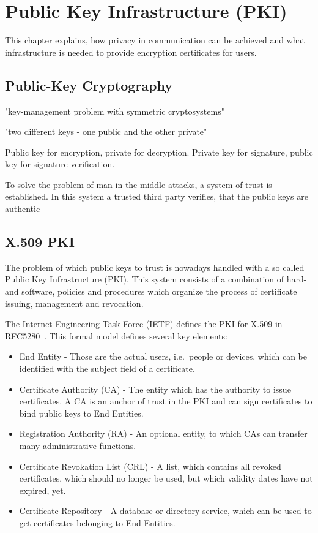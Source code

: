 \chapter{Public Key Infrastructure (PKI)}\label{ch:publicKeyInfrastructure}

This chapter explains, how privacy in communication can be achieved and what infrastructure is needed to provide
encryption certificates for users.

\section{Public-Key Cryptography}\label{sec:publicKeyCryptography}
"key-management problem with symmetric cryptosystems"

"two different keys - one public and the other private"~\cite{schneier2007applied, diffie1976new}

Public key for encryption, private for decryption.
Private key for signature, public key for signature verification.

To solve the problem of man-in-the-middle attacks, a system of trust is established.
In this system a trusted third party verifies, that the public keys are authentic

\section{X.509 PKI}\label{sec:publicKeyInfrastructure}
The problem of which public keys to trust is nowadays handled with a so called Public Key Infrastructure (PKI).
This system consists of a combination of hard- and software, policies and procedures which organize the process of
certificate issuing, management and revocation.

The Internet Engineering Task Force (IETF) defines the PKI for X.509 in RFC5280~\cite{RFC5280}.
This formal model defines several key elements:
\begin{itemize}
    \item End Entity - Those are the actual users, i.e.\ people or devices, which can be identified with the subject
    field of a certificate.
    \item Certificate Authority (CA) - The entity which has the authority to issue certificates.
    A CA is an anchor of trust in the PKI and can sign certificates to bind public keys to End Entities.
    \item Registration Authority (RA) - An optional entity, to which CAs can transfer many administrative functions.
    \item Certificate Revokation List (CRL) - A list, which contains all revoked certificates, which should no longer be
    used, but which validity dates have not expired, yet.
    \item Certificate Repository - A database or directory service, which can be used to get certificates belonging to
    End Entities.
\end{itemize}

